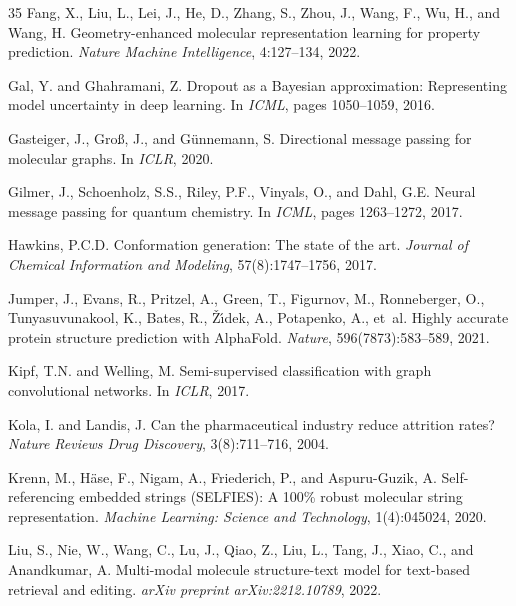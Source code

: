\documentclass[11pt]{article}
\begin{document}
\begin{thebibliography}{35}
Fang, X., Liu, L., Lei, J., He, D., Zhang, S., Zhou, J., Wang, F., Wu, H., and Wang, H.
\newblock Geometry-enhanced molecular representation learning for property prediction.
\newblock \emph{Nature Machine Intelligence}, 4:127--134, 2022.

Gal, Y. and Ghahramani, Z.
\newblock Dropout as a Bayesian approximation: Representing model uncertainty in deep learning.
\newblock In \emph{ICML}, pages 1050--1059, 2016.

Gasteiger, J., Gro{\ss}, J., and G{\"u}nnemann, S.
\newblock Directional message passing for molecular graphs.
\newblock In \emph{ICLR}, 2020.

Gilmer, J., Schoenholz, S.S., Riley, P.F., Vinyals, O., and Dahl, G.E.
\newblock Neural message passing for quantum chemistry.
\newblock In \emph{ICML}, pages 1263--1272, 2017.

Hawkins, P.C.D.
\newblock Conformation generation: The state of the art.
\newblock \emph{Journal of Chemical Information and Modeling}, 57(8):1747--1756, 2017.

Jumper, J., Evans, R., Pritzel, A., Green, T., Figurnov, M., Ronneberger, O., Tunyasuvunakool, K., Bates, R., {\v{Z}}{\'\i}dek, A., Potapenko, A., et~al.
\newblock Highly accurate protein structure prediction with AlphaFold.
\newblock \emph{Nature}, 596(7873):583--589, 2021.

Kipf, T.N. and Welling, M.
\newblock Semi-supervised classification with graph convolutional networks.
\newblock In \emph{ICLR}, 2017.

Kola, I. and Landis, J.
\newblock Can the pharmaceutical industry reduce attrition rates?
\newblock \emph{Nature Reviews Drug Discovery}, 3(8):711--716, 2004.

Krenn, M., H{\"a}se, F., Nigam, A., Friederich, P., and Aspuru-Guzik, A.
\newblock Self-referencing embedded strings (SELFIES): A 100\% robust molecular string representation.
\newblock \emph{Machine Learning: Science and Technology}, 1(4):045024, 2020.

Liu, S., Nie, W., Wang, C., Lu, J., Qiao, Z., Liu, L., Tang, J., Xiao, C., and Anandkumar, A.
\newblock Multi-modal molecule structure-text model for text-based retrieval and editing.
\newblock \emph{arXiv preprint arXiv:2212.10789}, 2022.


\end{thebibliography}
\end{document}
